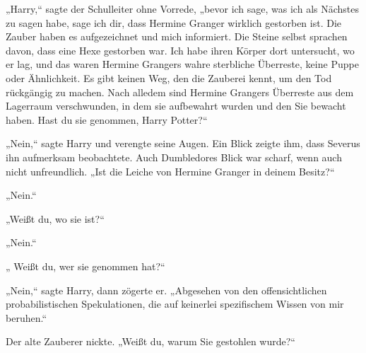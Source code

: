 „Harry,“ sagte der Schulleiter ohne Vorrede, „bevor ich sage, was ich als Nächstes zu sagen habe, sage ich dir, dass Hermine Granger wirklich gestorben ist. Die Zauber haben es aufgezeichnet und mich informiert. Die Steine selbst sprachen davon, dass eine Hexe gestorben war. Ich habe ihren Körper dort untersucht, wo er lag, und das waren Hermine Grangers wahre sterbliche Überreste, keine Puppe oder Ähnlichkeit. Es gibt keinen Weg, den die Zauberei kennt, um den Tod rückgängig zu machen. Nach alledem sind Hermine Grangers Überreste aus dem Lagerraum verschwunden, in dem sie aufbewahrt wurden und den Sie bewacht haben. Hast du sie genommen, Harry Potter?“


„Nein,“ sagte Harry und verengte seine Augen.
Ein Blick zeigte ihm, dass Severus ihn aufmerksam beobachtete. Auch Dumbledores Blick war scharf, wenn auch nicht unfreundlich. „Ist die Leiche von Hermine Granger in deinem Besitz?“

„Nein.“

„Weißt du, wo sie ist?“

„Nein.“

„ Weißt du, wer sie genommen hat?“

„Nein,“ sagte Harry, dann zögerte er. „Abgesehen von den offensichtlichen probabilistischen Spekulationen, die auf keinerlei spezifischem Wissen von mir beruhen.“

Der alte Zauberer nickte.
„Weißt du, warum Sie gestohlen wurde?“

